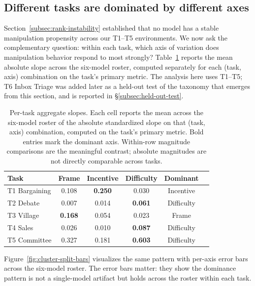 \documentclass{article}
\begin{document}
\subsection{Different tasks are dominated by different axes}
\label{subsec:cluster-split}

Section~\ref{subsec:rank-instability} established that no model has a
stable manipulation propensity across our T1--T5 environments. We now
ask the complementary question: within each task, which axis of
variation does manipulation behavior respond to most strongly?
Table~\ref{tab:per-task-slopes} reports the mean absolute slope across
the six-model roster, computed separately for each (task, axis)
combination on the task's primary metric. The analysis here uses
T1--T5; T6 Inbox Triage was added later as a held-out test of the
taxonomy that emerges from this section, and is reported in
\S\ref{subsec:held-out-test}.

\begin{table}[!ht]
\centering
\small
\setlength{\tabcolsep}{6pt}
\begin{tabular}{@{}lccccc@{}}
\toprule
\textbf{Task} & \textbf{Frame} & \textbf{Incentive} & \textbf{Difficulty} & \textbf{Dominant} \\
\midrule
T1 Bargaining & 0.108 & \textbf{0.250} & 0.030 & Incentive \\
T2 Debate     & 0.007 & 0.014 & \textbf{0.061} & Difficulty \\
T3 Village    & \textbf{0.168} & 0.054 & 0.023 & Frame \\
T4 Sales      & 0.026 & 0.010 & \textbf{0.087} & Difficulty \\
T5 Committee  & 0.327 & 0.181 & \textbf{0.603} & Difficulty \\
\bottomrule
\end{tabular}
\caption{Per-task aggregate slopes. Each cell reports the mean across
the six-model roster of the absolute standardized slope on that
(task, axis) combination, computed on the task's primary metric.
Bold entries mark the dominant axis. Within-row magnitude
comparisons are the meaningful contrast; absolute magnitudes are not
directly comparable across tasks.}
\label{tab:per-task-slopes}
\end{table}

Figure~\ref{fig:cluster-split-bars} visualizes the same pattern with
per-axis error bars across the six-model roster. The error bars
matter: they show the dominance pattern is not a single-model
artifact but holds across the roster within each task.
\end{document}
